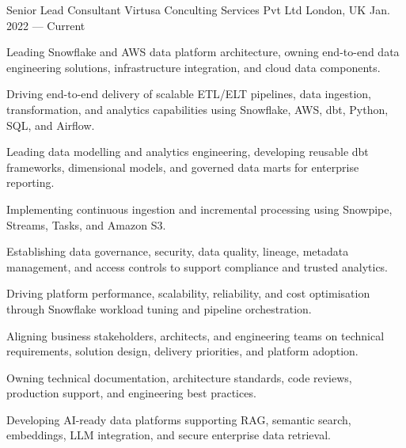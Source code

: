
\begin{cventries}

  \cventry
  {Senior Lead Consultant} %
  {Virtusa Conculting Services Pvt Ltd  } %
  {London, UK} %
  {Jan. 2022 --- Current} %
  {
    \begin{cvitems} %
    \item {Leading Snowflake and AWS data platform architecture, owning end-to-end data engineering solutions, infrastructure integration, and cloud data components.}
    \item {Driving end-to-end delivery of scalable ETL/ELT pipelines, data ingestion, transformation, and analytics capabilities using Snowflake, AWS, dbt, Python, SQL, and Airflow.}
    \item {Leading data modelling and analytics engineering, developing reusable dbt frameworks, dimensional models, and governed data marts for enterprise reporting.}
    \item {Implementing continuous ingestion and incremental processing using Snowpipe, Streams, Tasks, and Amazon S3.}
    \item {Establishing data governance, security, data quality, lineage, metadata management, and access controls to support compliance and trusted analytics.}
    \item {Driving platform performance, scalability, reliability, and cost optimisation through Snowflake workload tuning and pipeline orchestration.}
    \item {Aligning business stakeholders, architects, and engineering teams on technical requirements, solution design, delivery priorities, and platform adoption.}
    \item {Owning technical documentation, architecture standards, code reviews, production support, and engineering best practices.}
    \item {Developing AI-ready data platforms supporting RAG, semantic search, embeddings, LLM integration, and secure enterprise data retrieval.}
    \end{cvitems}
  }


\end{cventries}
